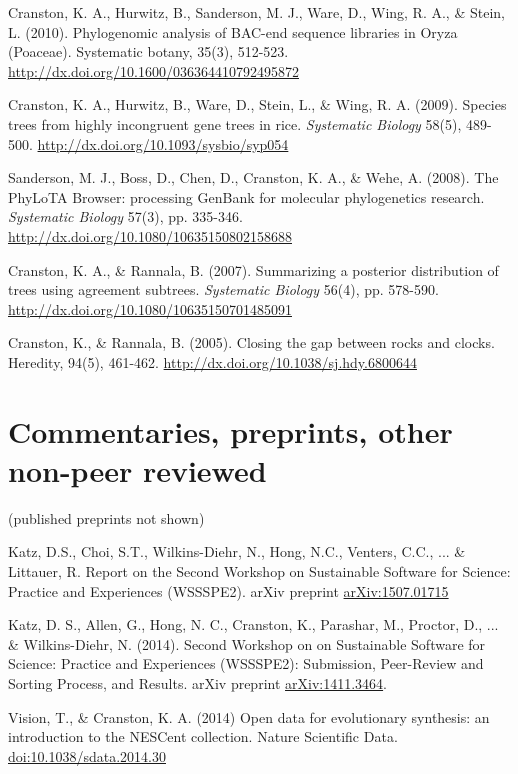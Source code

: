 \documentclass[10pt]{article}
\begin{document}
Cranston, K. A., Hurwitz, B., Sanderson, M. J., Ware, D., Wing, R. A., \& Stein, L. (2010). Phylogenomic analysis of BAC-end sequence libraries in Oryza (Poaceae). Systematic botany, 35(3), 512-523. \url{http://dx.doi.org/10.1600/036364410792495872} 

Cranston, K. A., Hurwitz, B., Ware, D., Stein, L., \& Wing, R. A. (2009). Species trees from highly incongruent gene trees in rice.  \textit{Systematic Biology} 58(5), 489-500. \url{http://dx.doi.org/10.1093/sysbio/syp054} 

Sanderson, M. J., Boss, D., Chen, D., Cranston, K. A., \& Wehe, A. (2008). The PhyLoTA Browser: processing GenBank for molecular phylogenetics research. \textit{Systematic Biology} 57(3), pp. 335-346. \url{http://dx.doi.org/10.1080/10635150802158688} 

Cranston, K. A., \& Rannala, B. (2007). Summarizing a posterior distribution of trees using agreement subtrees. \textit{Systematic Biology} 56(4), pp. 578-590. \\
\url{http://dx.doi.org/10.1080/10635150701485091} 

Cranston, K., \& Rannala, B. (2005). Closing the gap between rocks and clocks. Heredity, 94(5), 461-462. \url{http://dx.doi.org/10.1038/sj.hdy.6800644}

\section*{Commentaries, preprints, other non-peer reviewed}

(published preprints not shown)

Katz, D.S., Choi, S.T., Wilkins-Diehr, N., Hong, N.C., Venters, C.C., ... \& Littauer, R. Report on the Second Workshop on Sustainable Software for Science: Practice and Experiences (WSSSPE2). arXiv preprint \href{http://arxiv.org/abs/1507.01715}{arXiv:1507.01715}

Katz, D. S., Allen, G., Hong, N. C., Cranston, K., Parashar, M., Proctor, D., ... \& Wilkins-Diehr, N. (2014). Second Workshop on on Sustainable Software for Science: Practice and Experiences (WSSSPE2): Submission, Peer-Review and Sorting Process, and Results. arXiv preprint \href{http://arxiv.org/abs/1411.3464}{arXiv:1411.3464}.

Vision, T., \& Cranston, K. A. (2014) Open data for evolutionary synthesis: an introduction to the NESCent collection. Nature Scientific Data. \href{http://dx.doi.org/10.1038/sdata.2014.30}{doi:10.1038/sdata.2014.30}
\end{document}
